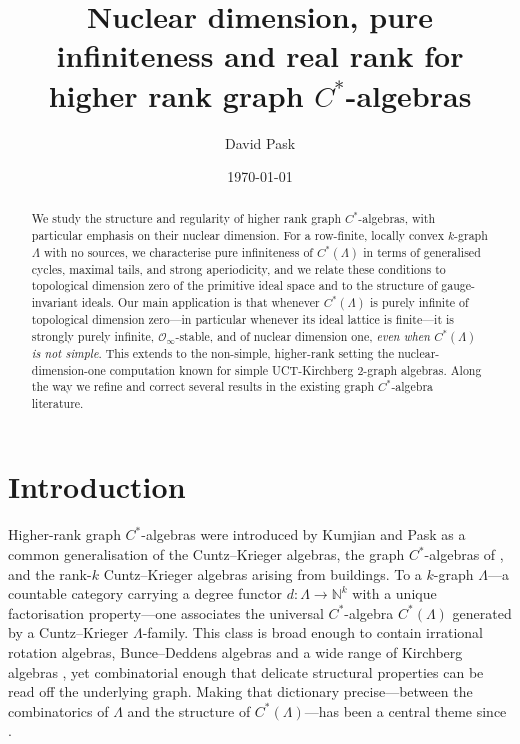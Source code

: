 \documentclass[12pt]{amsart}
\title[Nuclear dimension and pure infiniteness for higher rank graph $C^*$-algebras]
{Nuclear dimension, pure infiniteness and real rank for higher rank graph $C^*$-algebras}
\author{David Pask}
\date{\today}
\theoremstyle{plain}
\theoremstyle{definition}
\theoremstyle{remark}
\newcommand{\N}{\mathbb{N}}
\begin{document}
\begin{abstract}
We study the structure and regularity of higher rank graph $C^*$-algebras, with
particular emphasis on their nuclear dimension. For a row-finite, locally convex
$k$-graph $\Lambda$ with no sources, we characterise pure infiniteness of
$C^*(\Lambda)$ in terms of generalised cycles, maximal tails, and strong
aperiodicity, and we relate these conditions to topological dimension zero of the
primitive ideal space and to the structure of gauge-invariant ideals. Our main
application is that whenever $C^*(\Lambda)$ is purely infinite of topological
dimension zero---in particular whenever its ideal lattice is finite---it is
strongly purely infinite, $\mathcal O_\infty$-stable, and of nuclear dimension
one, \emph{even when $C^*(\Lambda)$ is not simple}. This extends to the
non-simple, higher-rank setting the nuclear-dimension-one computation known for
simple UCT-Kirchberg $2$-graph algebras. Along the way we refine and correct
several results in the existing graph $C^*$-algebra literature.
\end{abstract}

\maketitle

\section{Introduction}\label{sec:intro}

Higher-rank graph $C^*$-algebras were introduced by Kumjian and Pask
\cite{KP2} as a common generalisation of the Cuntz--Krieger algebras, the
graph $C^*$-algebras of \cite{KPR,KPRR,BPRS}, and the rank-$k$ Cuntz--Krieger
algebras arising from buildings. To a $k$-graph $\Lambda$---a countable
category carrying a degree functor $d\colon\Lambda\to\N^k$ with a unique
factorisation property---one associates the universal $C^*$-algebra
$C^*(\Lambda)$ generated by a Cuntz--Krieger $\Lambda$-family. This class is
broad enough to contain irrational rotation algebras, Bunce--Deddens algebras
and a wide range of Kirchberg algebras \cite{PRRS}, yet combinatorial enough
that delicate structural properties can be read off the underlying graph.
Making that dictionary precise---between the combinatorics of $\Lambda$ and
the structure of $C^*(\Lambda)$---has been a central theme since
\cite{KP2,RSY1,KaP}.
\end{document}
